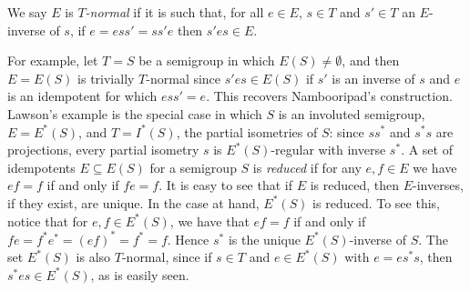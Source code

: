 \documentclass[12pt]{amsart}
\theoremstyle{definition}
\begin{document}
We say $E$ is {\em $T$-normal} if it is such that, for all $e\in E$, $s\in T$ and $s'\in T$ an $E$-inverse of $s$, if $e=ess'=ss'e$ then $s'es\in E$.  

For example, let $T=S$ be a semigroup in which $E(S)\neq\emptyset$, and then $E=E(S)$ is trivially $T$-normal since $s'es\in E(S)$ if $s'$ is an inverse of $s$ and $e$ is an idempotent for which $ess'=e$.  This recovers Nambooripad's construction.  Lawson's example is the special case in which $S$ is an involuted semigroup, $E=E^*(S)$, and $T=I^*(S)$, the partial isometries of $S$: since $ss^*$ and $s^*s$ are projections, every partial isometry $s$ is $E^*(S)$-regular with inverse $s^*$.  A set of idempotents $E\subseteq E(S)$ for a semigroup $S$ is {\em reduced} if for any $e,f\in E$ we have $ef=f$ if and only if $fe=f$. It is easy to see that if $E$ is reduced, then $E$-inverses, if they exist, are unique. In the case at hand, $E^*(S)$ is reduced. To see this, notice that  for $e,f\in E^*(S)$, we have that $ef=f$ if and only if $fe=f^*e^*=(ef)^*=f^*=f$. Hence $s^*$ is the unique $E^*(S)$-inverse of $S$.  The set $E^*(S)$ is also $T$-normal, since if $s\in T$ and $e\in E^*(S)$ with $e=es^*s$, then $s^*es\in E^*(S)$, as is easily seen.  
\end{document}
